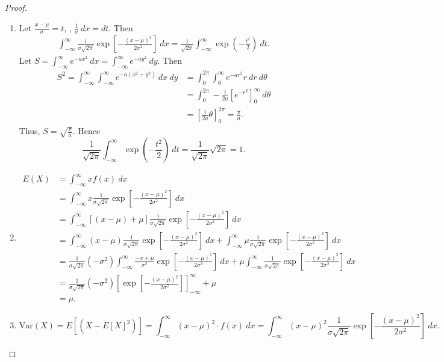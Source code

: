 \documentclass[12pt,a4paper]{article}
\theoremstyle{definition}
\theoremstyle{definition}
\theoremstyle{definition}
\theoremstyle{definition}
\theoremstyle{remark}
\theoremstyle{definition}
\newcommand{\dispsty}{\displaystyle}
\newcommand{\ie}{\text{i.e.}}
\newcommand{\Var}{\text{Var}}
\begin{document}
\begin{proof}
	\ \begin{enumerate}
		\item Let $\dispsty\frac{x-\mu}{\sigma}=t$, \ie, $\dispsty\frac{1}{\sigma}\ dx=dt$. Then \begin{align*}
		\int_{-\infty}^\infty\frac{1}{\sigma\sqrt{2\pi}}\exp\left[-\frac{(x-\mu)^2}{2\sigma^2}\right]\ dx=\frac{1}{\sqrt{2\pi}}\int_{-\infty}^\infty \exp\left(-\frac{t^2}{2}\right)\ dt.
		\end{align*} Let $\dispsty S=\int_{-\infty}^\infty e^{-ax^2}\ dx=\int_{-\infty}^\infty e^{-ay^2}\ dy$. Then \begin{align*}
		S^2=\int_{-\infty}^{\infty}\int_{-\infty}^{\infty}e^{-a(x^2+y^2)}\ dx\ dy&=\int_0^{2\pi}\int_{0}^{\infty}e^{-ar^2} r\ dr\ d\theta\\
		&=\int_0^{2\pi}-\frac{1}{2a}\left[e^{-r^2}\right]_0^\infty\ d\theta\\
		&=\left[\frac{1}{2a}\theta\right]_0^{2\pi}=\frac{\pi}{a}.
		\end{align*} Thus, $S=\dispsty\sqrt{\frac{\pi}{a}}$. Hence \[
		\frac{1}{\sqrt{2\pi}}\int_{-\infty}^\infty \exp\left(-\frac{t^2}{2}\right)\ dt=\frac{1}{\sqrt{2\pi}}\sqrt{2\pi}=1.
		\]
		\item \begin{align*}
		E(X)&=\int_{-\infty}^\infty xf(x)\ dx\\&=\int_{-\infty}^\infty x\frac{1}{\sigma\sqrt{2\pi}}\exp\left[-\frac{(x-\mu)^2}{2\sigma^2}\right]\ dx\\
		&=\int_{-\infty}^\infty \left[(x-\mu)+\mu\right]\frac{1}{\sigma\sqrt{2\pi}}\exp\left[-\frac{(x-\mu)^2}{2\sigma^2}\right]\ dx\\
		&=\int_{-\infty}^\infty (x-\mu)\frac{1}{\sigma\sqrt{2\pi}}\exp\left[-\frac{(x-\mu)^2}{2\sigma^2}\right]\ dx+\int_{-\infty}^\infty \mu\frac{1}{\sigma\sqrt{2\pi}}\exp\left[-\frac{(x-\mu)^2}{2\sigma^2}\right]\ dx\\
		&=\frac{1}{\sigma\sqrt{2\pi}}(-\sigma^2)\int_{-\infty}^\infty\frac{-x+\mu}{\sigma^2}\exp\left[-\frac{(x-\mu)^2}{2\sigma^2}\right]\ dx +\mu\int_{-\infty}^\infty\frac{1}{\sigma\sqrt{2\pi}}\exp\left[-\frac{(x-\mu)^2}{2\sigma^2}\right]\ dx\\
		&=\frac{1}{\sigma\sqrt{2\pi}}(-\sigma^2)\left[\exp\left[-\frac{(x-\mu)^2}{2\sigma^2}\right]\right]_{-\infty}^\infty+\mu\\
		&=\mu.
		\end{align*}
		\item \[
		\Var(X)=E[(X-E[X]^2)]=\int_{-\infty}^\infty(x-\mu)^2\cdot f(x)\ dx=\int_{-\infty}^\infty(x-\mu)^2\frac{1}{\sigma\sqrt{2\pi}}\exp\left[-\frac{(x-\mu)^2}{2\sigma^2}\right]\ dx.
\]
\end{enumerate}
\end{proof}
\end{document}
